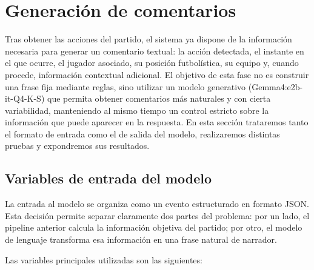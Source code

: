 \section{Generación de comentarios}
\label{sec:generacion-comentarios}

Tras obtener las acciones del partido, el sistema ya dispone de la información necesaria para generar un comentario textual: la acción detectada, el instante en el que ocurre, el jugador asociado, su posición futbolística, su equipo y, cuando procede, información contextual adicional. El objetivo de esta fase no es construir una frase fija mediante reglas, sino utilizar un modelo generativo (Gemma4:e2b-it-Q4-K-S) que permita obtener comentarios más naturales y con cierta variabilidad, manteniendo al mismo tiempo un control estricto sobre la información que puede aparecer en la respuesta. En esta sección trataremos tanto el formato de entrada como el de salida del modelo, realizaremos distintas pruebas y expondremos sus resultados.

\subsection{Variables de entrada del modelo}

La entrada al modelo se organiza como un evento estructurado en formato JSON. Esta decisión permite separar claramente dos partes del problema: por un lado, el pipeline anterior calcula la información objetiva del partido; por otro, el modelo de lenguaje transforma esa información en una frase natural de narrador.

Las variables principales utilizadas son las siguientes:

